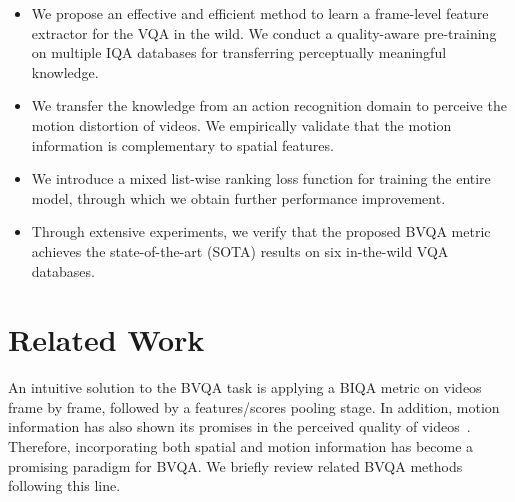 \documentclass[journal]{IEEEtran}
\begin{document}
\begin{itemize}
	
	\item[] We propose an effective and efficient method to learn a frame-level feature extractor for the VQA in the wild. We conduct a quality-aware pre-training on multiple IQA databases for transferring perceptually meaningful knowledge.
	
	\item[] We transfer the knowledge from an action recognition domain to perceive the motion distortion of videos. We empirically validate that the motion information is complementary to spatial features.

	\item[] We introduce a mixed list-wise ranking loss function for training the entire model, through which we obtain further performance improvement.
	
	\item[] Through extensive experiments, we verify that the proposed BVQA metric achieves the state-of-the-art (SOTA) results on six in-the-wild VQA databases.

\end{itemize}

\section{Related Work}\label{Sec:RelatedWork}

An intuitive solution to the BVQA task is applying a BIQA metric on videos frame by frame, followed by a features/scores pooling stage. In addition, motion information has also shown its promises in the perceived quality of videos~\cite{seshadrinathan2010motion, feichtenhofer2019slowfast, tu2020comparative}. Therefore, incorporating both spatial and motion information has become a promising paradigm for BVQA. We briefly review related BVQA methods following this line.
\end{document}
